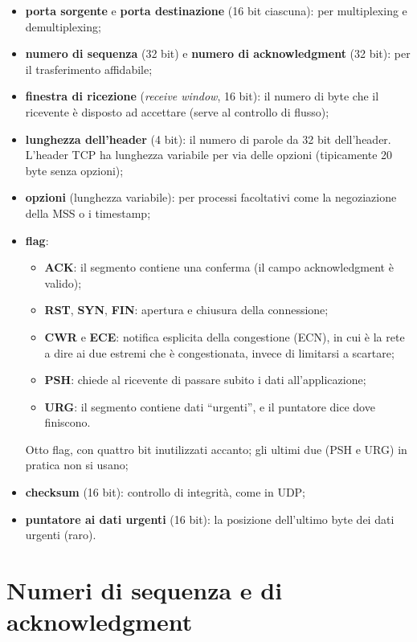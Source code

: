 \begin{itemize}
    \item \textbf{porta sorgente} e \textbf{porta destinazione} (16 bit ciascuna): per multiplexing e demultiplexing;
    \item \textbf{numero di sequenza} (32 bit) e \textbf{numero di acknowledgment} (32 bit): per il trasferimento affidabile;
    \item \textbf{finestra di ricezione} (\emph{receive window}, 16 bit): il numero di byte che il ricevente è
          disposto ad accettare (serve al controllo di flusso);
    \item \textbf{lunghezza dell'header} (4 bit): il numero di parole da 32 bit dell'header. L'header TCP ha
          lunghezza variabile per via delle opzioni (tipicamente 20 byte senza opzioni);
    \item \textbf{opzioni} (lunghezza variabile): per processi facoltativi come la negoziazione della MSS o i timestamp;
    \item \textbf{flag}:
    \begin{itemize}
      \item \textbf{ACK}: il segmento contiene una conferma (il campo acknowledgment è valido);
      \item \textbf{RST}, \textbf{SYN}, \textbf{FIN}: apertura e chiusura della connessione;
      \item \textbf{CWR} e \textbf{ECE}: notifica esplicita della congestione (ECN), in cui è la rete a dire ai due estremi
            che è congestionata, invece di limitarsi a scartare;
      \item \textbf{PSH}: chiede al ricevente di passare subito i dati all'applicazione;
      \item \textbf{URG}: il segmento contiene dati ``urgenti'', e il puntatore dice dove finiscono.
    \end{itemize}
    Otto flag, con quattro bit inutilizzati accanto; gli ultimi due (PSH e URG) in pratica non si usano;
    \item \textbf{checksum} (16 bit): controllo di integrità, come in UDP;
    \item \textbf{puntatore ai dati urgenti} (16 bit): la posizione dell'ultimo byte dei dati urgenti (raro).
\end{itemize}

\section{Numeri di sequenza e di acknowledgment}

